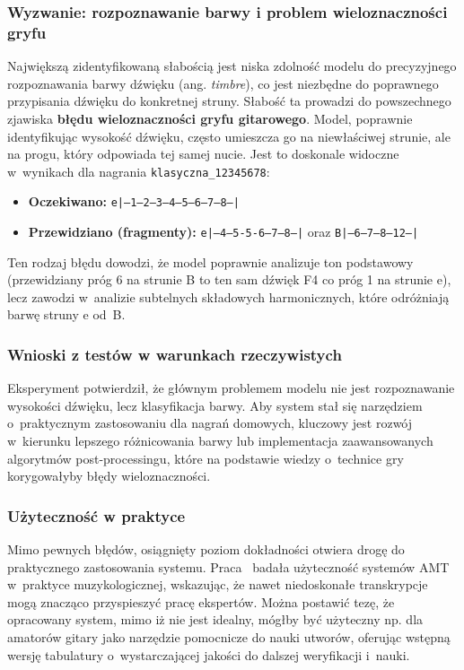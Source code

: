 \subsubsection{Wyzwanie: rozpoznawanie barwy i problem wieloznaczności gryfu}
Największą zidentyfikowaną słabością jest niska zdolność modelu do precyzyjnego rozpoznawania barwy dźwięku (ang. \textit{timbre}), co jest niezbędne do poprawnego przypisania dźwięku do konkretnej struny. Słabość ta prowadzi do powszechnego zjawiska \textbf{błędu wieloznaczności gryfu gitarowego}. Model, poprawnie identyfikując wysokość dźwięku, często umieszcza go na niewłaściwej strunie, ale na progu, który odpowiada tej samej nucie. Jest to doskonale widoczne w~wynikach dla nagrania \texttt{klasyczna\_12345678}:
\begin{itemize}
    \item \textbf{Oczekiwano:} \texttt{e|--1--2--3--4--5--6--7--8--|}
    \item \textbf{Przewidziano (fragmenty):} \texttt{e|--4--5-5-6--7--8--|} oraz \texttt{B|--6--7--8--12--|}
\end{itemize}
Ten rodzaj błędu dowodzi, że model poprawnie analizuje ton podstawowy (przewidziany próg 6 na strunie B to ten sam dźwięk F4 co próg 1 na strunie e), lecz zawodzi w~analizie subtelnych składowych harmonicznych, które odróżniają barwę struny e od~B.

\subsubsection{Wnioski z testów w warunkach rzeczywistych}
\label{sssec:wnioski_rzeczywiste}
Eksperyment potwierdził, że głównym problemem modelu nie jest rozpoznawanie wysokości dźwięku, lecz klasyfikacja barwy. Aby system stał się narzędziem o~praktycznym zastosowaniu dla nagrań domowych, kluczowy jest rozwój w~kierunku lepszego różnicowania barwy lub implementacja zaawansowanych algorytmów post-processingu, które na podstawie wiedzy o~technice gry korygowałyby błędy wieloznaczności.

\subsubsection{Użyteczność w praktyce}
\label{ssec:uzytecznosc_praktyka}

Mimo pewnych błędów, osiągnięty poziom dokładności otwiera drogę do praktycznego zastosowania systemu. Praca~\autocite{Holzapfel2019Ethnomusicology} badała użyteczność systemów AMT w~praktyce muzykologicznej, wskazując, że nawet niedoskonałe transkrypcje mogą znacząco przyspieszyć pracę ekspertów. Można postawić tezę, że opracowany system, mimo iż nie jest idealny, mógłby być użyteczny np. dla amatorów gitary jako narzędzie pomocnicze do nauki utworów, oferując wstępną wersję tabulatury o~wystarczającej jakości do dalszej weryfikacji i~nauki.

